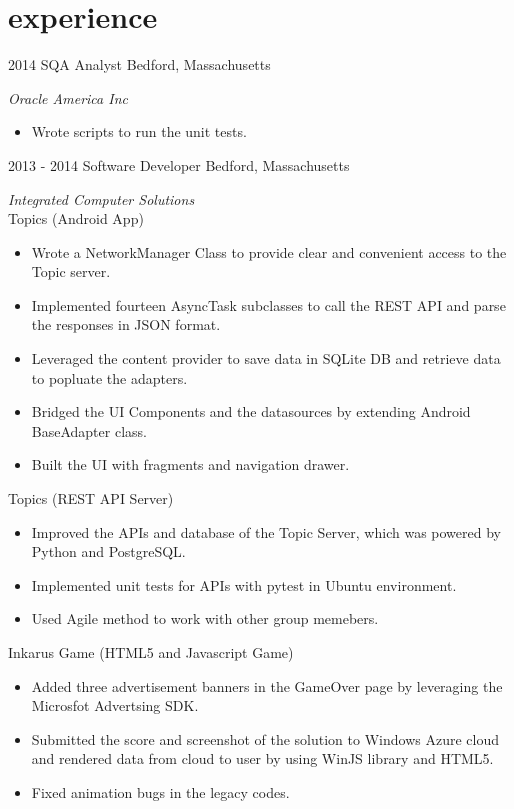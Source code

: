\documentclass[]{ly-cv} %
\begin{document}
\section{experience}
\begin{entrylist}
\entry
{2014}
{SQA Analyst}
{Bedford, Massachusetts}
{\emph{Oracle America Inc}
\begin{itemize}
  \item Wrote scripts to run the unit tests.
\end{itemize}}
\entry
{2013 - 2014}
{Software Developer}
{Bedford, Massachusetts}
{\emph{Integrated Computer Solutions}\vspace{1mm}\\
Topics (Android App)
\begin{itemize}
  \item Wrote a NetworkManager Class to provide clear and convenient access to the Topic server.
  \item Implemented fourteen AsyncTask subclasses to call the REST API and parse the responses in JSON format.
  \item Leveraged the content provider to save data in SQLite DB and retrieve data to popluate the adapters.
  \item Bridged the UI Components and the datasources by extending Android BaseAdapter class.
  \item Built the UI with fragments and navigation drawer.
\end{itemize}
Topics (REST API Server)
\begin{itemize}
  \item Improved the APIs and database of the Topic Server, which was powered by Python and PostgreSQL.
  \item Implemented unit tests for APIs with pytest in Ubuntu environment.
  \item Used Agile method to work with other group memebers.
\end{itemize}
Inkarus Game (HTML5 and Javascript Game)
\begin{itemize}
  \item Added three advertisement banners in the GameOver page by leveraging the Microsfot Advertsing SDK.
  \item Submitted the score and screenshot of the solution to Windows Azure cloud and rendered data from cloud to user by using WinJS library and HTML5.
  \item Fixed animation bugs in the legacy codes.
\end{itemize}}

\end{entrylist}
\end{document}
